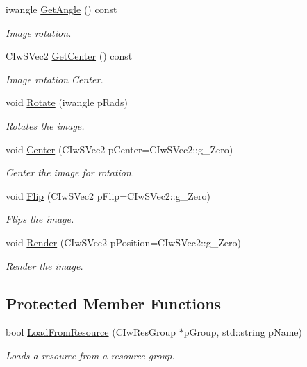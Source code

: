\begin{DoxyCompactItemize}
iwangle \hyperlink{class_ty_image_a5a668f8889876f414a9ada1a2c48a363}{GetAngle} () const 
\begin{DoxyCompactList}\small\item\em Image rotation. \end{DoxyCompactList}\item 
CIwSVec2 \hyperlink{class_ty_image_ae2ff69a9cf1df8072f8c7ce72c54d0cf}{GetCenter} () const 
\begin{DoxyCompactList}\small\item\em Image rotation Center. \end{DoxyCompactList}\item 
void \hyperlink{class_ty_image_a04fa3888567c658155b8e1bafacdcc2f}{Rotate} (iwangle pRads)
\begin{DoxyCompactList}\small\item\em Rotates the image. \end{DoxyCompactList}\item 
void \hyperlink{class_ty_image_ada0106ce57cc13b9b646c60919043f4b}{Center} (CIwSVec2 pCenter=CIwSVec2::g\_\-Zero)
\begin{DoxyCompactList}\small\item\em Center the image for rotation. \end{DoxyCompactList}\item 
void \hyperlink{class_ty_image_a5a5d78591702db018684d90a3caab367}{Flip} (CIwSVec2 pFlip=CIwSVec2::g\_\-Zero)
\begin{DoxyCompactList}\small\item\em Flips the image. \end{DoxyCompactList}\item 
void \hyperlink{class_ty_image_ae15f22535190bfe2e848e4b1a6dee494}{Render} (CIwSVec2 pPosition=CIwSVec2::g\_\-Zero)
\begin{DoxyCompactList}\small\item\em Render the image. \end{DoxyCompactList}\end{DoxyCompactItemize}
\subsection*{Protected Member Functions}
\begin{DoxyCompactItemize}
\item 
bool \hyperlink{class_ty_image_a75ac7a92ab126c2818e92728ff812b3d}{LoadFromResource} (CIwResGroup $\ast$pGroup, std::string pName)
\begin{DoxyCompactList}\small\item\em Loads a resource from a resource group. \end{DoxyCompactList}\end{DoxyCompactItemize}
